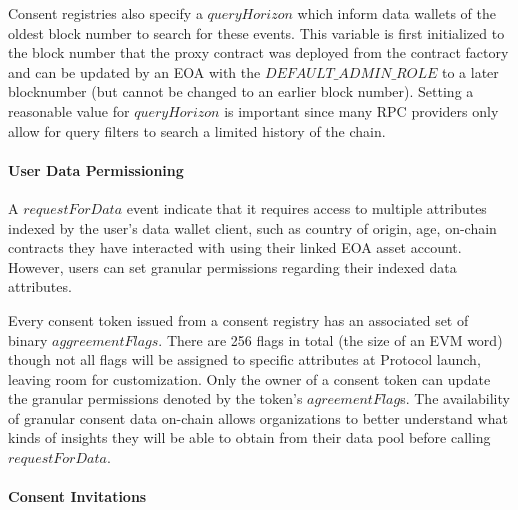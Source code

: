 Consent registries also specify a $queryHorizon$ which inform data wallets of the oldest block number to search for these events. This variable is 
first initialized to the block number that the proxy contract was deployed from the contract factory and can be updated by an EOA with the $DEFAULT\_ADMIN\_ROLE$
to a later blocknumber (but cannot be changed to an earlier block number). Setting a reasonable value for $queryHorizon$ is important since many RPC providers
only allow for query filters to search a limited history of the chain.

\paragraph{User Data Permissioning}
\label{section:UserPermissions}

A $requestForData$ event indicate that it requires access to multiple attributes indexed by the user's data wallet client, such as country of origin, age,
on-chain contracts they have interacted with using their linked EOA asset account. However, users can set granular permissions regarding their indexed data 
attributes. 

Every consent token issued from a consent registry has an associated set of binary $aggreementFlags$. There are 256 flags in total (the size of an EVM word) 
though not all flags will be assigned to specific attributes at Protocol launch, leaving room for customization. Only the owner of a consent token can 
update the granular permissions denoted by the token's $agreementFlag$s. The availability of granular consent data on-chain allows organizations to better 
understand what kinds of insights they will be able to obtain from their data pool before calling $requestForData$. 

\paragraph{Consent Invitations}
\label{section:ConsentInvitations}


